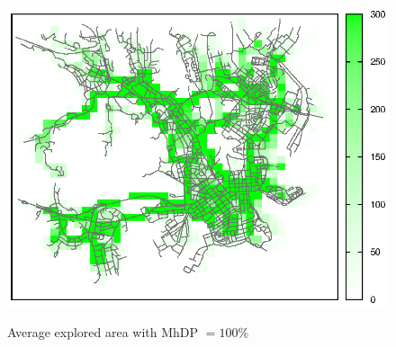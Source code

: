 \begin{figure}[htbp]
{\includegraphics[scale=0.85]{grafici/mappe/M2MShare_3_hop_100perc.eps}}
\caption{Average explored area with MhDP $= 100\%$\label{fig:mappaMultiHop_100}}
\end{figure}





%
%


